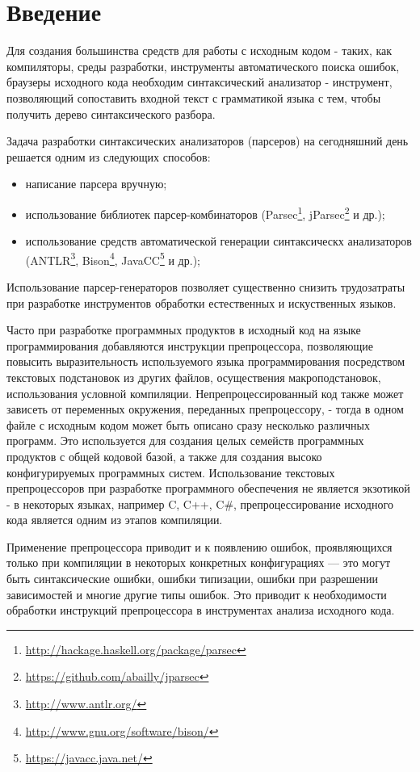 \clearpage
\section{Введение}

Для создания большинства средств для работы с исходным кодом - таких, как компиляторы, среды разработки, инструменты автоматического поиска ошибок, браузеры исходного кода необходим синтаксический анализатор - инструмент, позволяющий сопоставить входной текст с грамматикой языка с тем, чтобы получить дерево синтаксического разбора\cite{aho}.

Задача разработки синтаксических анализаторов (парсеров) на сегодняшний день решается одним из следующих способов:
\begin{itemize}
	\item написание парсера вручную;
	\item использование библиотек парсер-комбинаторов (Parsec\footnote{\url{http://hackage.haskell.org/package/parsec}}, jParsec\footnote{\url{https://github.com/abailly/jparsec}} и др.);
	\item использование средств автоматической генерации синтаксическх анализаторов (ANTLR\footnote{\url{http://www.antlr.org/}}, Bison\footnote{\url{http://www.gnu.org/software/bison/}}, JavaCC\footnote{\url{https://javacc.java.net/}} и др.);
\end{itemize}
Использование парсер-генераторов позволяет существенно снизить трудозатраты при разработке инструментов обработки естественных и искуственных языков.

Часто при разработке программных продуктов в исходный код на языке программирования добавляются инструкции препроцессора, позволяющие повысить выразительность используемого языка программирования посредством текстовых подстановок из других файлов, осуществения макроподстановок, использования условной компиляции. Непрепроцессированный код также может зависеть от переменных окружения, переданных препроцессору, - тогда в одном файле с исходным кодом может быть описано сразу несколько различных программ. Это используется для создания целых семейств программных продуктов с общей кодовой базой\cite{flightsoftwareproductline}, а также для создания высоко конфигурируемых программных систем. Использование текстовых препроцессоров при разработке программного обеспечения не является экзотикой - в некоторых языках, например C, C++, C\#, препроцессирование исходного кода является одним из этапов компиляции.

Применение препроцессора приводит и к появлению ошибок, проявляющихся только при компиляции в некоторых конкретных конфигурациях --- это могут быть синтаксические ошибки, ошибки типизации, ошибки при разрешении зависимостей и многие другие типы ошибок. Это приводит к необходимости обработки инструкций препроцессора в инструментах анализа исходного кода.

